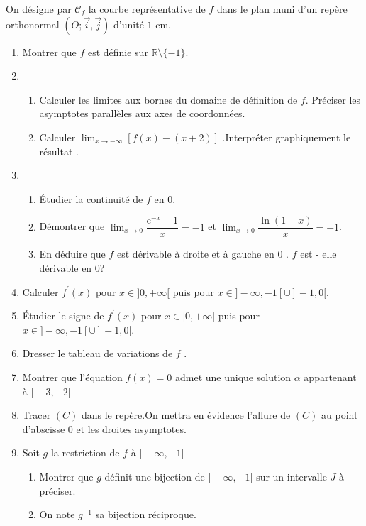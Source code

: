 \begin{enumerate}
 On désigne par  $\mathscr{C}_{f}$ la courbe représentative de $ f $ dans le plan muni d'un repère
 orthonormal $(O ;\overrightarrow{i},\overrightarrow{j})$ d'unité $ 1  $ cm.
 \begin{enumerate}
 \item Montrer que $ f $ est définie sur $  \mathbb{R}\setminus\lbrace-1\rbrace $.
 \item 
 \begin{enumerate}
 \item Calculer les limites aux bornes du domaine de définition de $ f $. Préciser les asymptotes parallèles aux axes de coordonnées.
 \item Calculer $ \displaystyle \lim_{x \to - \infty}[f(x)-(x+2)]  $ .Interpréter graphiquement le résultat . 
 \end{enumerate}
 \item
 \begin{enumerate}
 \item Étudier la continuité de $ f $ en 0.
 \item Démontrer que $ \displaystyle \lim_{x \to 0}\dfrac{\text{e}^{-x}-1}{x} =-1 $  et $ \displaystyle \lim_{x \to 0}\dfrac{\ln(1-x) }{x} =-1 $.
 \item En déduire que $ f $ est dérivable à  droite et à  gauche en 0 . $ f $ est - elle dérivable en 0?
 \end{enumerate}
 \item Calculer $ f^{'}(x) $ pour $ x\in]0 , +\infty[ $ puis pour $ x\in]-\infty ,-1[\cup]-1  ,0[ $.
 \item Étudier le signe de $  f^{'}(x)  $ pour $ x\in]0 , +\infty[ $ puis pour $ x\in]-\infty ,-1[\cup]-1  ,0[ $.
 \item Dresser le tableau de variations de $ f $ .
 \item Montrer que l'équation  $ f(x)= 0 $ admet une unique solution $ \alpha $ appartenant à $ ]-3, -2[ $
 \item Tracer $( C) $ dans le repère.On mettra en évidence l'allure de $( C) $ au point d'abscisse 0 et les droites asymptotes.  

 
\item 
 Soit $ g $ la restriction de $ f $ à $]-\infty , -1[ $ 
 \begin{enumerate}
 \item Montrer que $ g $ définit une bijection  de $ ]-\infty , -1[ $ sur un  intervalle   $J $ à préciser.
 \item On note $ g^{-1} $ sa bijection réciproque.


\end{enumerate}
\end{enumerate}
\end{enumerate}
